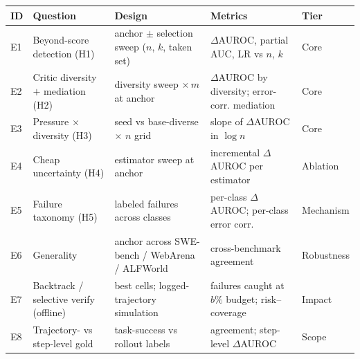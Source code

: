 \documentclass[11pt]{article}
\begin{document}
\renewcommand{\arraystretch}{1.2}
\begin{table}[h]\footnotesize\centering
\begin{tabularx}{\textwidth}{@{}l l X X l@{}}
\toprule
\textbf{ID} & \textbf{Question} & \textbf{Design} & \textbf{Metrics} & \textbf{Tier}\\
\midrule
E1 & Beyond-score detection (H1) & anchor $\pm$ selection sweep ($n$, $k$, taken set) & $\Delta$AUROC, partial AUC, LR vs $n$, $k$ & Core\\
E2 & Critic diversity $+$ mediation (H2) & diversity sweep $\times\, m$ at anchor & $\Delta$AUROC by diversity; error-corr. mediation & Core\\
E3 & Pressure $\times$ diversity (H3) & seed vs base-diverse $\times$ $n$ grid & slope of $\Delta$AUROC in $\log n$ & Core\\
E4 & Cheap uncertainty (H4) & estimator sweep at anchor & incremental $\Delta$AUROC per estimator & Ablation\\
E5 & Failure taxonomy (H5) & labeled failures across classes & per-class $\Delta$AUROC; per-class error corr. & Mechanism\\
E6 & Generality & anchor across SWE-bench / WebArena / ALFWorld & cross-benchmark agreement & Robustness\\
E7 & Backtrack / selective verify (offline) & best cells; logged-trajectory simulation & failures caught at $b\%$ budget; risk--coverage & Impact\\
E8 & Trajectory- vs step-level gold & task-success vs rollout labels & agreement; step-level $\Delta$AUROC & Scope\\
\bottomrule
\end{tabularx}
\end{table}
\end{document}
